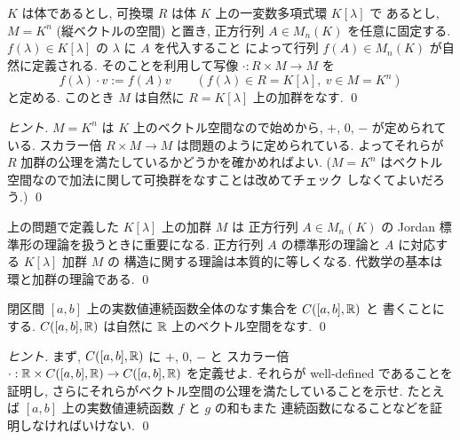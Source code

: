 \documentclass[12pt,twoside]{jarticle}
\begin{document}

\begin{question}[5点]
  $K$ は体であるとし, 可換環 $R$ は体 $K$ 上の一変数多項式環 $K[\lambda]$ で
  あるとし, $M=K^n$ (縦ベクトルの空間) と置き, 
  正方行列 $A\in M_n(K)$ を任意に固定する.
  $f(\lambda)\in K[\lambda]$ の $\lambda$ に $A$ を代入すること
  によって行列 $f(A)\in M_n(K)$ が自然に定義される.
  そのことを利用して写像 $\cdot:R\times M\to M$ を 
  \begin{equation*}
    f(\lambda)\cdot v := f(A)v
    \qquad
    (f(\lambda)\in R=K[\lambda],\ v\in M=K^n)
  \end{equation*}
  と定める. このとき $M$ は自然に $R=K[\lambda]$ 上の加群をなす. \qed
\end{question}

\begin{proof}[ヒント]
  $M=K^n$ は $K$ 上のベクトル空間なので始めから, $+$, $0$, $-$ が定められて
  いる. スカラー倍 $R\times M\to M$ は問題のように定められている.
  よってそれらが $R$ 加群の公理を満たしているかどうかを確かめればよい.
  ($M=K^n$ はベクトル空間なので加法に関して可換群をなすことは改めてチェック
  しなくてよいだろう.)
  \qed
\end{proof}

\begin{guide}
  上の問題で定義した $K[\lambda]$ 上の加群 $M$ は
  正方行列 $A\in M_n(K)$ の Jordan 標準形の理論を扱うときに重要になる.
  正方行列 $A$ の標準形の理論と $A$ に対応する $K[\lambda]$ 加群 $M$ の
  構造に関する理論は本質的に等しくなる.
  代数学の基本は環と加群の理論である.
  \qed
\end{guide}


\begin{question}[連続函数全体のなすベクトル空間, 5点]
  \label{q:C0-1}
  閉区間 $[a,b]$ 上の実数値連続函数全体のなす集合を $C([a,b],{\mathbb R})$ と
  書くことにする. $C([a,b],{\mathbb R})$ は自然に ${\mathbb R}$ 上のベクトル空間をなす.
  \qed
\end{question}

\begin{proof}[ヒント]
  まず, $C([a,b],{\mathbb R})$ に $+$, $0$, $-$ と
  スカラー倍 $\cdot:{\mathbb R}\times C([a,b],{\mathbb R})\to C([a,b],{\mathbb R})$ を定義せよ.
  それらが well-defined であることを証明し,
  さらにそれらがベクトル空間の公理を満たしていることを示せ.
  たとえば $[a,b]$ 上の実数値連続函数 $f$ と $g$ の和もまた
  連続函数になることなどを証明しなければいけない.
  \qed
\end{proof}
\end{document}
